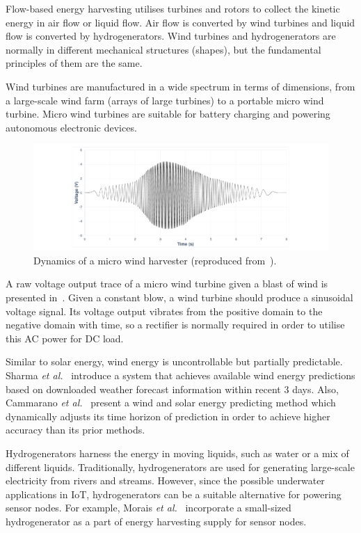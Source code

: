 Flow-based energy harvesting utilises turbines and rotors to collect the kinetic energy in air flow or liquid flow. Air flow is converted by wind turbines and liquid flow is converted by hydrogenerators. Wind turbines and hydrogenerators are normally in different mechanical structures (shapes), but the fundamental principles of them are the same.

Wind turbines are manufactured in a wide spectrum in terms of dimensions, from a large-scale wind farm (arrays of large turbines) to a portable micro wind turbine. Micro wind turbines are suitable for battery charging and powering autonomous electronic devices. 

\begin{figure}
    \centering
    \includegraphics[width=\columnwidth]{ch2_review/figures/micro_wind_turbine}
    \caption{Dynamics of a micro wind harvester (reproduced from~\cite{balsamo2016graceful}).}
    \label{Figure:micro_wind_turbine}
\end{figure}

A raw voltage output trace of a micro wind turbine given a blast of wind is presented in~. Given a constant blow, a wind turbine should produce a sinusoidal voltage signal. Its voltage output vibrates from the positive domain to the negative domain with time, so a rectifier is normally required in order to utilise this AC power for DC load.

Similar to solar energy, wind energy is uncontrollable but partially predictable. Sharma \textit{et al.}~\cite{sharma2010cloudy} introduce a system that achieves available wind energy predictions based on downloaded weather forecast information within recent 3 days. Also, Cammarano \textit{et al.}~\cite{cammarano2012pro} present a wind and solar energy predicting method which dynamically adjusts its time horizon of prediction in order to achieve higher accuracy than its prior methods. 

Hydrogenerators harness the energy in moving liquids, such as water or a mix of different liquids. Traditionally, hydrogenerators are used for generating large-scale electricity from rivers and streams. However, since the possible underwater applications in IoT, hydrogenerators can be a suitable alternative for powering sensor nodes. For example, Morais \textit{et al.}~\cite{morais2008sun} incorporate a small-sized hydrogenerator as a part of energy harvesting supply for sensor nodes. 

